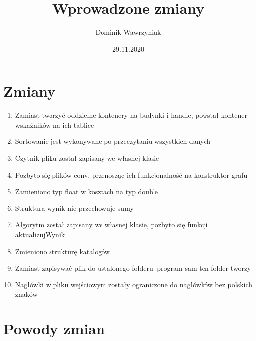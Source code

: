 \documentclass{article}
\title{Wprowadzone zmiany}
\date{29.11.2020}
\author{Dominik Wawrzyniuk}
\begin{document}
\maketitle

\section{Zmiany}

\begin{enumerate}
	\item Zamiast tworzyć oddzielne kontenery na budynki i handle, powstał kontener wskaźników na ich tablice
	\item Sortowanie jest wykonywane po przeczytaniu wszystkich danych
	\item Czytnik pliku został zapisany we własnej klasie
	\item Pozbyto się plików conv, przenosząc ich funkcjonalność na konstruktor grafu
	\item Zamieniono typ float w kosztach na typ double
	\item Struktura wynik nie przechowuje sumy
	\item Algorytm został zapisany we własnej klasie, pozbyto się funkcji aktualizujWynik
	\item Zmieniono strukturę katalogów
	\item Zamiast zapisywać plik do ustalonego folderu, program sam ten folder tworzy
	\item Nagłówki w pliku wejściowym zostały ograniczone do nagłówków bez polskich znaków
\end{enumerate}

\newpage{}

\section{Powody zmian}
\end{document}
